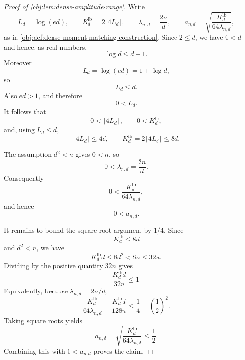 \begin{proof}[Proof of \cref{obj:lem:dense-amplitude-range}]
Write
\[
L_d=\log(ed),\qquad
K_d^{\mathrm{lb}}=2\lceil 4L_d\rceil,\qquad
\lambda_{n,d}=\frac{2n}{d},
\qquad
a_{n,d}=\sqrt{\frac{K_d^{\mathrm{lb}}}{64\lambda_{n,d}}},
\]
as in \cref{obj:def:dense-moment-matching-construction}.  Since \(2\le d\), we have \(0<d\) and hence, as real numbers,
\[
\log d\le d-1.
\]
Moreover
\[
L_d=\log(ed)=1+\log d,
\]
so
\[
L_d\le d.
\]
Also \(ed>1\), and therefore
\[
0<L_d.
\]
It follows that
\[
0<\lceil 4L_d\rceil,
\qquad
0<K_d^{\mathrm{lb}},
\]
and, using \(L_d\le d\),
\[
\lceil 4L_d\rceil\le 4d,
\qquad
K_d^{\mathrm{lb}}=2\lceil 4L_d\rceil\le 8d .
\]

The assumption \(d^2<n\) gives \(0<n\), so
\[
0<\lambda_{n,d}=\frac{2n}{d}.
\]
Consequently
\[
0<
\frac{K_d^{\mathrm{lb}}}{64\lambda_{n,d}},
\]
and hence
\[
0<a_{n,d}.
\]

It remains to bound the square-root argument by \(1/4\).  Since
\[
K_d^{\mathrm{lb}}\le 8d
\]
and \(d^2<n\), we have
\[
K_d^{\mathrm{lb}}d\le 8d^2<8n\le 32n .
\]
Dividing by the positive quantity \(32n\) gives
\[
\frac{K_d^{\mathrm{lb}}d}{32n}\le 1.
\]
Equivalently, because \(\lambda_{n,d}=2n/d\),
\[
\frac{K_d^{\mathrm{lb}}}{64\lambda_{n,d}}
=
\frac{K_d^{\mathrm{lb}}d}{128n}
\le
\frac14
=
\left(\frac12\right)^2 .
\]
Taking square roots yields
\[
a_{n,d}
=
\sqrt{\frac{K_d^{\mathrm{lb}}}{64\lambda_{n,d}}}
\le
\frac12 .
\]
Combining this with \(0<a_{n,d}\) proves the claim.
\end{proof}
